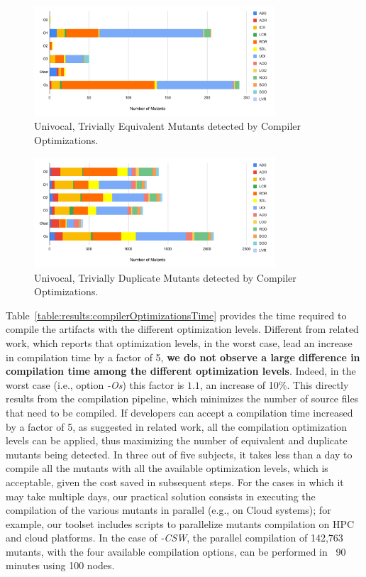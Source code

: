 \begin{figure}[tb]
\begin{center}
\includegraphics[width=9cm]{images/univ-eq}
\caption{Univocal, Trivially Equivalent Mutants detected by Compiler Optimizations.}
\label{fig:results:univeq}
\end{center}
\end{figure}

\begin{figure}[tb]
\begin{center}
\includegraphics[width=9cm]{images/univ-red}
\caption{Univocal, Trivially Duplicate Mutants detected by Compiler Optimizations.}
\label{fig:results:univred}
\end{center}
\end{figure}




Table~\ref{table:results:compilerOptimizationsTime} provides the time required to compile the artifacts with the different optimization levels. Different from related work, which reports that optimization levels, in the worst case, lead an increase in compilation time by a factor of 5, \textbf{we do not observe a large difference in compilation time among the different optimization levels}. Indeed, in the worst case (i.e., option \emph{-Os}) this factor is $1.1$, an increase of 10\%. This directly results from the \APPR compilation pipeline, which minimizes the number of source files that need to be compiled. If developers can accept a compilation time increased by a factor of 5, as suggested in related work, all the compilation optimization levels can be applied, thus maximizing the number of equivalent and duplicate mutants being detected. In three out of five subjects, it takes less than a day to compile all the mutants with all the available optimization levels, which is acceptable, given the cost saved in subsequent steps. For the cases in which it may take multiple days, our practical solution consists in executing the compilation of the various mutants in parallel (e.g., on Cloud systems); for example, our toolset includes scripts to parallelize mutants compilation on HPC and cloud platforms. In the case of \SAIL{}\emph{-CSW}, the parallel compilation of 142,763 mutants, with the four available compilation options, can be performed in ~90 minutes using 100 nodes.



